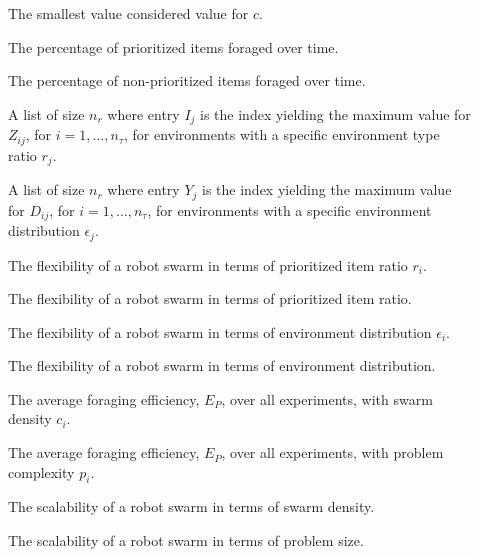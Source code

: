 \begin{description}
	\item[\parbox{\namewidth}{$c_{min}$}] The smallest value considered value for $c$.
	
	\item[\parbox{\namewidth}{$E_P$}] The percentage of prioritized items foraged over time.

	\item[\parbox{\namewidth}{$E_{NP}$}] The percentage of non-prioritized items foraged over time.

	\item[\parbox{\namewidth}{$I$}] A list of size $n_r$ where entry $I_j$ is the index yielding the maximum value for $Z_{ij}$, for $i = 1,..., n_\tau$, for environments with a specific environment type ratio $r_j$.

	\item[\parbox{\namewidth}{$Y$}] A list of size $n_r$ where entry $Y_j$ is the index yielding the maximum value for $D_{ij}$, for $i = 1,..., n_\tau$, for environments with a specific environment distribution $\epsilon_j$.


	\item[\parbox{\namewidth}{$F_{r_i}$}] The flexibility of a robot swarm in terms of prioritized item ratio $r_i$.

	\item[\parbox{\namewidth}{$F_r$}] The flexibility of a robot swarm in terms of prioritized item ratio.

	\item[\parbox{\namewidth}{$F_{\epsilon_i}$}] The flexibility of a robot swarm in terms of environment distribution $\epsilon_i$.

	\item[\parbox{\namewidth}{$F_\epsilon$}] The flexibility of a robot swarm in terms of environment distribution.

	\item[\parbox{\namewidth}{$E_{c_i}$}] The average foraging efficiency, $E_P$, over all experiments, with swarm density $c_i$.

	\item[\parbox{\namewidth}{$E_{p_i}$}] The average foraging efficiency, $E_P$, over all experiments, with problem complexity $p_i$.

	\item[\parbox{\namewidth}{$S_c$}] The scalability of a robot swarm in terms of swarm density.	
	
	\item[\parbox{\namewidth}{$S_p$}] The scalability of a robot swarm in terms of problem size.	
	

\end{description}
